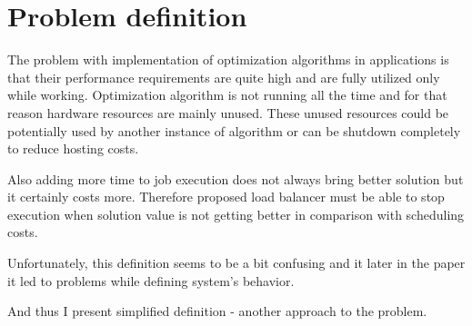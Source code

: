
\chapter{Problem definition}\label{ch:problem-definition}

The problem with implementation of optimization algorithms in applications is that their
performance requirements are quite high and are fully utilized only while working.
Optimization algorithm is not running all the time and for that reason hardware resources are mainly unused.
These unused resources could be potentially used by another instance of algorithm
or can be shutdown completely to reduce hosting costs.

Also adding more time to job execution does not always bring better solution
but it certainly costs more.
Therefore proposed load balancer must be able to stop execution when solution value
is not getting better in comparison with scheduling costs.





\bigskip

\noindent Unfortunately, 
this definition seems to be a bit confusing and it later in the paper it led to problems while defining system's behavior.

And thus I present simplified definition - another approach to the problem.



%